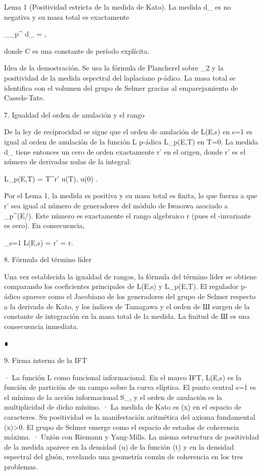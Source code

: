 \documentclass[12pt,a4paper]{book}
\begin{document}
Lema 1 (Positividad estricta de la medida de Kato). La medida d\mu_{} es no negativa y su masa total es exactamente

\int_{_p^\times} d\mu_{} = ,

donde C es una constante de período explícita.

Idea de la demostración. Se usa la fórmula de Plancherel sobre _2 y la positividad de la medida espectral del laplaciano p-ádico. La masa total se identifica con el volumen del grupo de Selmer gracias al emparejamiento de Cassels-Tate.

7. Igualdad del orden de anulación y el rango

De la ley de reciprocidad se sigue que el orden de anulación de L(E,s) en s=1 es igual al orden de anulación de la función L p-ádica L_p(E,T) en T=0. La medida d\mu_{} tiene entonces un cero de orden exactamente r' en el origen, donde r' es el número de derivadas nulas de la integral:

L_p(E,T) = T^{r'} \cdot u(T), \quad u(0) .

Por el Lema 1, la medida es positiva y su masa total es finita, lo que fuerza a que r' sea igual al número de generadores del módulo de Iwasawa asociado a _{p^\infty}(E/). Este número es exactamente el rango algebraico r (pues el \mu-invariante es cero). En consecuencia,

_{s=1} L(E,s) = r' = r.

8. Fórmula del término líder

Una vez establecida la igualdad de rangos, la fórmula del término líder se obtiene comparando los coeficientes principales de L(E,s) y L_p(E,T). El regulador p-ádico aparece como el Jacobiano de los generadores del grupo de Selmer respecto a la derivada de Kato, y los índices de Tamagawa y el orden de Ш surgen de la constante de integración en la masa total de la medida. La finitud de Ш es una consecuencia inmediata.

∎

9. Firma interna de la IFT

· La función L como funcional informacional. En el marco IFT, L(E,s) es la función de partición de un campo \rho sobre la curva elíptica. El punto central s=1 es el mínimo de la acción informacional S_{}, y el orden de anulación es la multiplicidad de dicho mínimo.
· La medida de Kato es \rho(x) en el espacio de caracteres. Su positividad es la manifestación aritmética del axioma fundamental \rho(x)>0. El grupo de Selmer emerge como el espacio de estados de coherencia máxima.
· Unión con Riemann y Yang-Mills. La misma estructura de positividad de la medida aparece en la densidad \Phi(u) de la función \Xi(t) y en la densidad espectral del gluón, revelando una geometría común de coherencia en los tres problemas.
\end{document}
